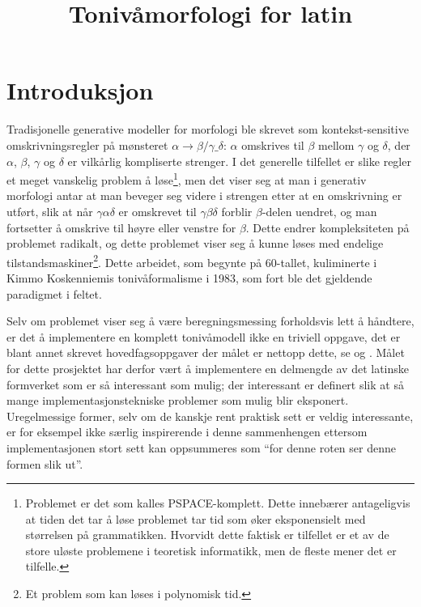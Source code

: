 \documentclass{article}
\title{Toniv\aa{}morfologi for latin}
\date{} %
\begin{document}
\maketitle

\section{Introduksjon}
Tradisjonelle generative modeller for morfologi ble skrevet som
kontekst-sensitive omskrivningsregler p\aa{} m\o{}nsteret $\alpha \to
\beta/\gamma \_ \delta$: $\alpha$ omskrives til $\beta$ mellom $\gamma$ og
$\delta$, der $\alpha$, $\beta$, $\gamma$ og $\delta$ er vilk\aa{}rlig
kompliserte strenger. I det generelle tilfellet er slike regler et meget
vanskelig problem \aa{} l\o{}se\footnote{Problemet er det som kalles
PSPACE-komplett. Dette inneb\ae{}rer antageligvis at tiden det tar \aa{}
l\o{}se problemet tar tid som \o{}ker eksponensielt med st\o{}rrelsen p\aa{}
grammatikken. Hvorvidt dette faktisk er tilfellet er et av de store ul\o{}ste
problemene i teoretisk informatikk, men de fleste mener det er tilfelle.}, men
det viser seg at man i generativ morfologi antar at man beveger seg videre i
strengen etter at en omskrivning er utf\o{}rt, slik at n\aa{}r
$\gamma\alpha\delta$ er omskrevet til $\gamma\beta\delta$ forblir
$\beta$-delen uendret, og man fortsetter \aa{} omskrive til h\o{}yre eller
venstre for $\beta$. Dette endrer kompleksiteten p\aa{} problemet radikalt, og
dette problemet viser seg \aa{} kunne l\o{}ses med endelige
tilstandsmaskiner\footnote{Et problem som kan l\o{}ses i polynomisk tid.}.
Dette arbeidet, som begynte p\aa{} 60-tallet, kuliminerte i Kimmo Koskenniemis
toniv\aa{}formalisme i 1983, som fort ble det gjeldende paradigmet i feltet. \cite{twolc}

Selv om problemet viser seg \aa{} v\ae{}re beregningsmessing forholdsvis lett
\aa{} h\aa{}ndtere, er det \aa{} implementere en komplett toniv\aa{}modell
ikke en triviell oppgave, det er blant annet skrevet hovedfagsoppgaver der
m\aa{}let er nettopp dette, se  og . M\aa{}let
for dette prosjektet har derfor v\ae{}rt \aa{} implementere en delmengde av
det latinske formverket som er s\aa{} interessant som mulig; der interessant
er definert slik at s\aa{} mange implementasjonstekniske problemer som mulig
blir eksponert. Uregelmessige former, selv om de kanskje rent praktisk sett er
veldig interessante, er for eksempel ikke s\ae{}rlig inspirerende i denne
sammenhengen ettersom implementasjonen stort sett kan oppsummeres som ``for
denne roten ser denne formen slik ut''.
\end{document}
